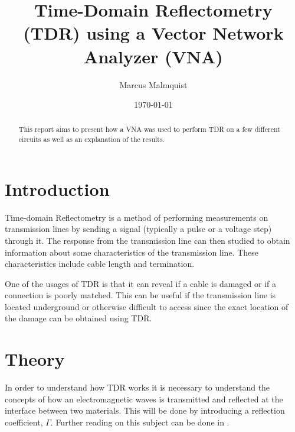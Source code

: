 \documentclass[12pt,a4paper]{article}
\title{Time-Domain Reflectometry (TDR) using a Vector Network Analyzer (VNA)}
\author{Marcus Malmquist}
\date{\today}
\begin{document}
\maketitle

\begin{abstract}
This report aims to present how a VNA was used to perform TDR on a few different circuits as well as an explanation of the results.
\end{abstract}

\newpage
{}
\tableofcontents
\newpage
{}
\section{Introduction}
Time-domain Reflectometry is a method of performing measurements on transmission lines by sending a signal (typically a pulse or a voltage step) through it. The response from the transmission line can then studied to obtain information about some characteristics of the transmission line. These characteristics include cable length and termination.

One of the usages of TDR is that it can reveal if a cable is damaged or if a connection is poorly matched. This can be useful if the transmission line is located underground or otherwise difficult to access since the exact location of the damage can be obtained using TDR.

\section{Theory}\label{sec:theory}
In order to understand how TDR works it is necessary to understand the concepts of how an electromagnetic waves is transmitted and reflected at the interface between two materials. This will be done by introducing a reflection coefficient, $\Gamma$. Further reading on this subject can be done in \cite{cheng}.
\end{document}
